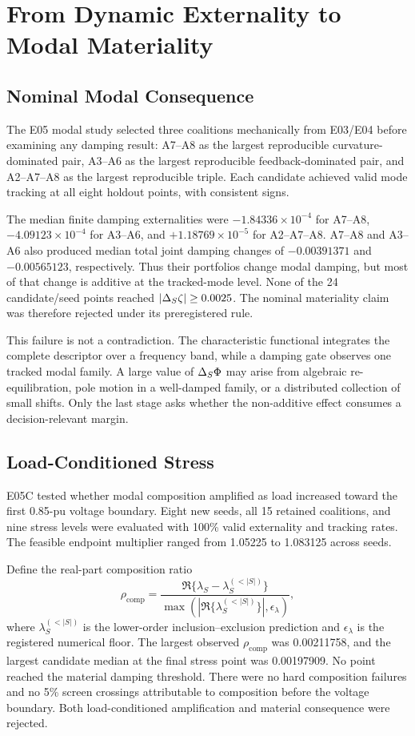 \section{From Dynamic Externality to Modal Materiality}
\subsection{Nominal Modal Consequence}

The E05 modal study selected three coalitions mechanically from E03/E04 before
examining any damping result: A7--A8 as the largest reproducible
curvature-dominated pair, A3--A6 as the largest reproducible
feedback-dominated pair, and A2--A7--A8 as the largest reproducible triple.
Each candidate achieved valid mode tracking at all eight holdout points, with
consistent signs.

The median finite damping externalities were
$-1.84336\times10^{-4}$ for A7--A8,
$-4.09123\times10^{-4}$ for A3--A6, and
$+1.18769\times10^{-5}$ for A2--A7--A8. A7--A8 and A3--A6 also produced
median total joint damping changes of $-0.00391371$ and $-0.00565123$,
respectively. Thus their portfolios change modal damping, but most of that
change is additive at the tracked-mode level. None of the 24 candidate/seed
points reached $|\Delta_{S}\zeta|\ge0.0025$. The nominal materiality claim was
therefore rejected under its preregistered rule.

This failure is not a contradiction. The characteristic functional integrates
the complete descriptor over a frequency band, while a damping gate observes
one tracked modal family. A large value of $\Delta_{S}\Phi$ may arise from
algebraic re-equilibration, pole motion in a well-damped family, or a
distributed collection of small shifts. Only the last stage asks whether the
non-additive effect consumes a decision-relevant margin.

\subsection{Load-Conditioned Stress}

E05C tested whether modal composition amplified as load increased toward the
first 0.85-pu voltage boundary. Eight new seeds, all 15 retained coalitions,
and nine stress levels were evaluated with 100\% valid externality and
tracking rates. The feasible endpoint multiplier ranged from 1.05225 to
1.083125 across seeds.

Define the real-part composition ratio
\begin{equation}
\rho_{\mathrm{comp}}=
\frac{\Re\{\lambda_{S}-\lambda_{S}^{(<|S|)}\}}
{\max(|\Re\{\lambda_{S}^{(<|S|)}\}|,\epsilon_\lambda)},
\label{eq:rho}
\end{equation}
where $\lambda_{S}^{(<|S|)}$ is the lower-order inclusion--exclusion
prediction and $\epsilon_\lambda$ is the registered numerical floor. The
largest observed $\rho_{\mathrm{comp}}$ was 0.00211758, and the largest
candidate median at the final stress point was 0.00197909. No point reached
the material damping threshold. There were no hard composition failures and
no 5\% screen crossings attributable to composition before the voltage
boundary. Both load-conditioned amplification and material consequence were
rejected.

